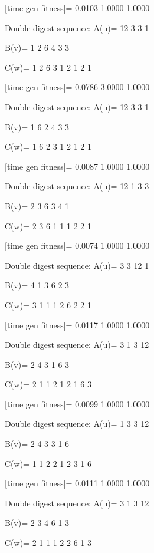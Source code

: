 [time gen fitness]=
    0.0103    1.0000    1.0000

Double digest sequence:
A(u)=
    12     3     3     1

B(v)=
     1     2     6     4     3     3

C(w)=
     1     2     6     3     1     2     1     2     1

[time gen fitness]=
    0.0786    3.0000    1.0000

Double digest sequence:
A(u)=
    12     3     3     1

B(v)=
     1     6     2     4     3     3

C(w)=
     1     6     2     3     1     2     1     2     1

[time gen fitness]=
    0.0087    1.0000    1.0000

Double digest sequence:
A(u)=
    12     1     3     3

B(v)=
     2     3     6     3     4     1

C(w)=
     2     3     6     1     1     1     2     2     1

[time gen fitness]=
    0.0074    1.0000    1.0000

Double digest sequence:
A(u)=
     3     3    12     1

B(v)=
     4     1     3     6     2     3

C(w)=
     3     1     1     1     2     6     2     2     1

[time gen fitness]=
    0.0117    1.0000    1.0000

Double digest sequence:
A(u)=
     3     1     3    12

B(v)=
     2     4     3     1     6     3

C(w)=
     2     1     1     2     1     2     1     6     3

[time gen fitness]=
    0.0099    1.0000    1.0000

Double digest sequence:
A(u)=
     1     3     3    12

B(v)=
     2     4     3     3     1     6

C(w)=
     1     1     2     2     1     2     3     1     6

[time gen fitness]=
    0.0111    1.0000    1.0000

Double digest sequence:
A(u)=
     3     1     3    12

B(v)=
     2     3     4     6     1     3

C(w)=
     2     1     1     1     2     2     6     1     3

